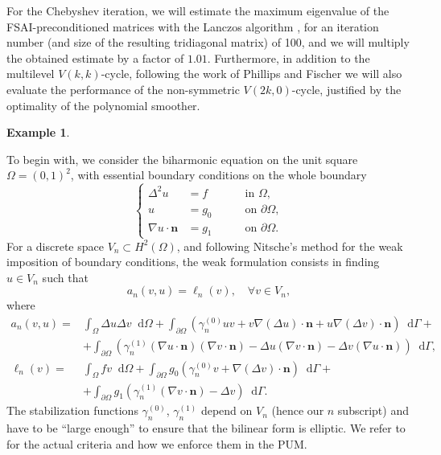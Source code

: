 \documentclass[a4paper]{article}
\newcommand{\diff}{\mathop{}\!\mathrm{d}}
\theoremstyle{plain}
\theoremstyle{definition}
\newtheorem{example}{Example}[section]
\theoremstyle{remark}
\begin{document}
For the Chebyshev iteration, we will estimate the maximum eigenvalue of the FSAI-preconditioned matrices with the Lanczos algorithm \cite{vanderVorst1982}, for an iteration number (and size of the resulting tridiagonal matrix) of 100, and we will multiply the obtained estimate by a factor of \(1.01\). Furthermore, in addition to the multilevel \(V(k, k)\)-cycle, following the work of Phillips and Fischer \cite{Phillips2022} we will also evaluate the performance of the non-symmetric \(V(2k, 0)\)-cycle, justified by the optimality of the polynomial smoother.

\begin{example}\label{ex:biharmonic_square}

	To begin with, we consider the biharmonic equation on the unit square \(\Omega = (0,1)^2\), with essential boundary conditions on the whole boundary
	\begin{equation*}
		\left\{
		\begin{aligned}
			\Delta^2 u &= f \quad &&\text{ in } \Omega,\\
			u &= g_0 \quad &&\text{ on } \partial\Omega,\\
			\nabla u \cdot \mathbf{n} &= g_1 \quad &&\text{ on } \partial\Omega.
		\end{aligned}
		\right.
	\end{equation*}
	For a discrete space \(V_n\subset H^2(\Omega)\), and following Nitsche's method for the weak imposition of boundary conditions, the weak formulation consists in finding \(u\in V_n\) such that
	\begin{equation*}
		a_n(v, u) = \ell_n(v),\quad \forall v \in V_n,
	\end{equation*}
	where
	\begin{equation}\label{eq:biharmonic_nitsche}
	\begin{aligned}
		a_n(v, u) =& \int_{\Omega} \Delta u \Delta v \diff\Omega + \int_{\partial\Omega} \left(\gamma_n^{(0)} u v + v \nabla(\Delta u) \cdot \mathbf{n} + u \nabla(\Delta v) \cdot \mathbf{n} \right) \diff\Gamma +\\
		&+ \int_{\partial\Omega} \left( \gamma_n^{(1)} (\nabla u \cdot \mathbf{n}) (\nabla v \cdot \mathbf{n}) - \Delta u (\nabla v \cdot \mathbf{n}) - \Delta v (\nabla u \cdot \mathbf{n}) \right) \diff\Gamma,\\
		\ell_n(v) =& \int_{\Omega} f v \diff\Omega + \int_{\partial\Omega} g_0 \left(\gamma_n^{(0)} v + \nabla(\Delta v) \cdot \mathbf{n} \right) \diff\Gamma +\\
		&+ \int_{\partial\Omega} g_1 \left( \gamma_n^{(1)} (\nabla v \cdot \mathbf{n}) - \Delta v \right) \diff\Gamma.
	\end{aligned}
	\end{equation}
	The stabilization functions \(\gamma_n^{(0)}\), \(\gamma_n^{(1)}\) depend on \(V_n\) (hence our \(n\) subscript) and have to be ``large enough'' to ensure that the bilinear form is elliptic. We refer to \cite{JimenezRecio2024} for the actual criteria and how we enforce them in the PUM.
	

\end{example}
\end{document}
